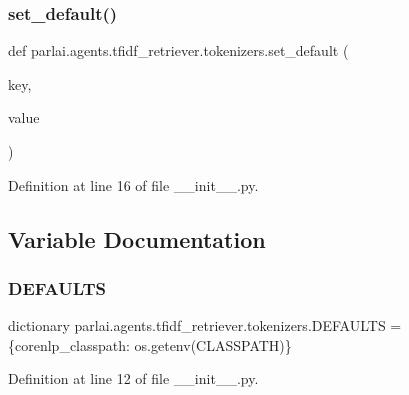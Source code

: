 \subsubsection{\texorpdfstring{set\+\_\+default()}{set\_default()}}
{\footnotesize\ttfamily def parlai.\+agents.\+tfidf\+\_\+retriever.\+tokenizers.\+set\+\_\+default (\begin{DoxyParamCaption}\item[{}]{key,  }\item[{}]{value }\end{DoxyParamCaption})}



Definition at line 16 of file \+\_\+\+\_\+init\+\_\+\+\_\+.\+py.



\subsection{Variable Documentation}
\mbox{\label{namespaceparlai_1_1agents_1_1tfidf__retriever_1_1tokenizers_aceb8da08449faf55b676b50a2c09a291}} 
\subsubsection{\texorpdfstring{D\+E\+F\+A\+U\+L\+TS}{DEFAULTS}}
{\footnotesize\ttfamily dictionary parlai.\+agents.\+tfidf\+\_\+retriever.\+tokenizers.\+D\+E\+F\+A\+U\+L\+TS = \{\textquotesingle{}corenlp\+\_\+classpath\textquotesingle{}\+: os.\+getenv(\textquotesingle{}C\+L\+A\+S\+S\+P\+A\+TH\textquotesingle{})\}}



Definition at line 12 of file \+\_\+\+\_\+init\+\_\+\+\_\+.\+py.


